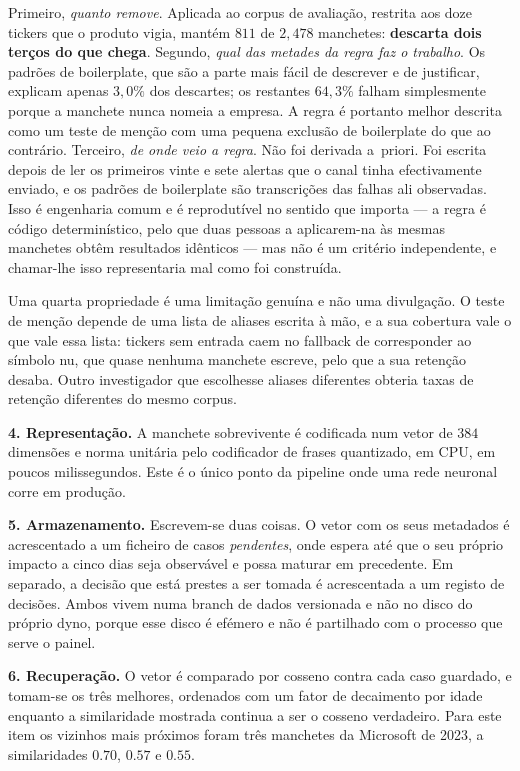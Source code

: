 Primeiro, \emph{quanto remove}. Aplicada ao corpus de avaliação, restrita aos doze tickers que o produto
vigia, mantém $811$ de $2{,}478$ manchetes: \textbf{descarta dois terços do que chega}. Segundo,
\emph{qual das metades da regra faz o trabalho}. Os padrões de boilerplate, que são a parte mais fácil de
descrever e de justificar, explicam apenas $3,0\%$ dos descartes; os restantes $64,3\%$ falham
simplesmente porque a manchete nunca nomeia a empresa. A regra é portanto melhor descrita como um teste
de menção com uma pequena exclusão de boilerplate do que ao contrário. Terceiro, \emph{de onde veio a
regra}. Não foi derivada a~priori. Foi escrita depois de ler os primeiros vinte e sete alertas que o
canal tinha efectivamente enviado, e os padrões de boilerplate são transcrições das falhas ali
observadas. Isso é engenharia comum e é reprodutível no sentido que importa --- a regra é código
determinístico, pelo que duas pessoas a aplicarem-na às mesmas manchetes obtêm resultados idênticos ---
mas não é um critério independente, e chamar-lhe isso representaria mal como foi construída.

Uma quarta propriedade é uma limitação genuína e não uma divulgação. O teste de menção depende de uma
lista de aliases escrita à mão, e a sua cobertura vale o que vale essa lista: tickers sem entrada caem no
fallback de corresponder ao símbolo nu, que quase nenhuma manchete escreve, pelo que a sua retenção
desaba. Outro investigador que escolhesse aliases diferentes obteria taxas de retenção diferentes do
mesmo corpus.

\textbf{4. Representação.} A manchete sobrevivente é codificada num vetor de $384$ dimensões e norma
unitária pelo codificador de frases quantizado, em CPU, em poucos milissegundos. Este é o único ponto
da pipeline onde uma rede neuronal corre em produção.

\textbf{5. Armazenamento.} Escrevem-se duas coisas. O vetor com os seus metadados é acrescentado a um
ficheiro de casos \emph{pendentes}, onde espera até que o seu próprio impacto a cinco dias seja
observável e possa maturar em precedente. Em separado, a decisão que está prestes a ser tomada é
acrescentada a um registo de decisões. Ambos vivem numa branch de dados versionada e não no disco do
próprio dyno, porque esse disco é efémero e não é partilhado com o processo que serve o painel.

\textbf{6. Recuperação.} O vetor é comparado por cosseno contra cada caso guardado, e tomam-se os três
melhores, ordenados com um fator de decaimento por idade enquanto a similaridade mostrada continua a
ser o cosseno verdadeiro. Para este item os vizinhos mais próximos foram três manchetes da Microsoft
de 2023, a similaridades $0.70$, $0.57$ e $0.55$.

